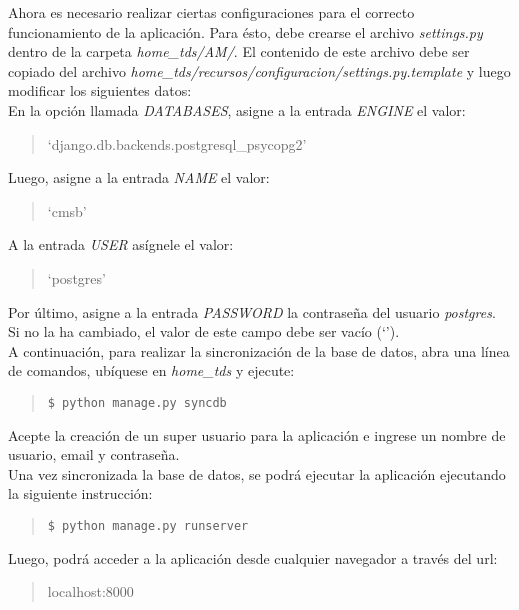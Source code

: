 \documentclass[12pt,a4paper]{article}
\begin{document}
Ahora es necesario realizar ciertas configuraciones para el correcto funcionamiento de la aplicación. Para ésto, debe crearse el archivo \emph{settings.py} dentro de la carpeta \emph{home\_tds/AM/}. El contenido de este archivo debe ser copiado del archivo \emph{home\_tds/recursos/configuracion/settings.py.template} y luego modificar los siguientes datos: \\

En la opción llamada \emph{DATABASES}, asigne a la entrada \emph{ENGINE} el valor:

\begin{quote}
`django.db.backends.postgresql\_psycopg2'
\end{quote}

Luego, asigne a la entrada \emph{NAME} el valor:

\begin{quote}
`cmsb'
\end{quote}

A la entrada \emph{USER} asígnele el valor:

\begin{quote}
`postgres'
\end{quote}

Por último, asigne a la entrada \emph{PASSWORD} la contraseña del usuario \emph{postgres}. Si no la ha cambiado, el valor de este campo debe ser vacío (`'). \\

A continuación, para realizar la sincronización de la base de datos, abra una línea de comandos, ubíquese en \emph{home\_tds} y ejecute:

\begin{quote}
\begin{verbatim}
$ python manage.py syncdb
\end{verbatim}
\end{quote}

Acepte la creación de un super usuario para la aplicación e ingrese un nombre de usuario, email y contraseña. \\

Una vez sincronizada la base de datos, se podrá ejecutar la aplicación ejecutando la siguiente instrucción:

\begin{quote}
\begin{verbatim}
$ python manage.py runserver
\end{verbatim}
\end{quote}

Luego, podrá acceder a la aplicación desde cualquier navegador a través del url:

\begin{quote}
localhost:8000
\end{quote}
\end{document}
